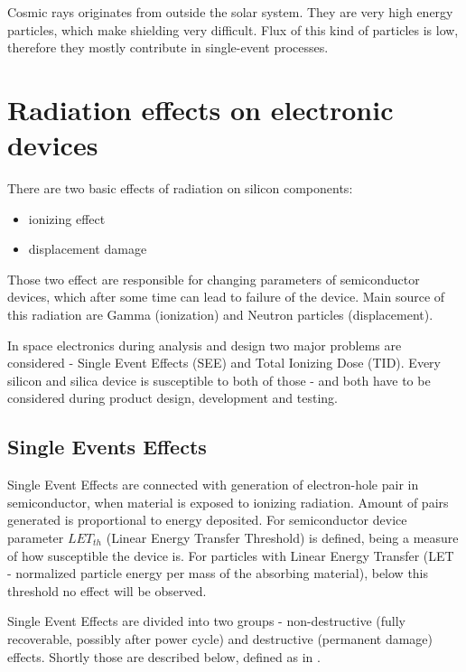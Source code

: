     Cosmic rays originates from outside the solar system. They are very high energy particles, which make shielding very difficult. Flux of this kind of particles is low, therefore they mostly contribute in single-event processes.

\section{Radiation effects on electronic devices}
    There are two basic effects of radiation on silicon components:
    \begin{itemize}
        \item ionizing effect
        \item displacement damage
    \end{itemize}

    Those two effect are responsible for changing parameters of semiconductor devices, which after some time can lead to failure of the device. Main source of this radiation are Gamma (ionization) and Neutron particles (displacement).

    In space electronics during analysis and design two major problems are considered - Single Event Effects (SEE) and Total Ionizing Dose (TID). Every silicon and silica device is susceptible to both of those - and both have to be considered during product design, development and testing.

    \subsection{Single Events Effects}
        Single Event Effects are connected with generation of electron-hole pair in semiconductor, when material is exposed to ionizing radiation. Amount of pairs generated is proportional to energy deposited. For semiconductor device parameter $LET_{th}$ (Linear Energy Transfer Threshold) is defined, being a measure of how susceptible the device is. For particles with Linear Energy Transfer (LET - normalized particle energy per mass of the absorbing material), below this threshold no effect will be observed.

        Single Event Effects are divided into two groups - non-destructive (fully recoverable, possibly after power cycle) and destructive (permanent damage) effects. Shortly those are described below, defined as in \cite{ECSS_Q_ST_60_15C}.

